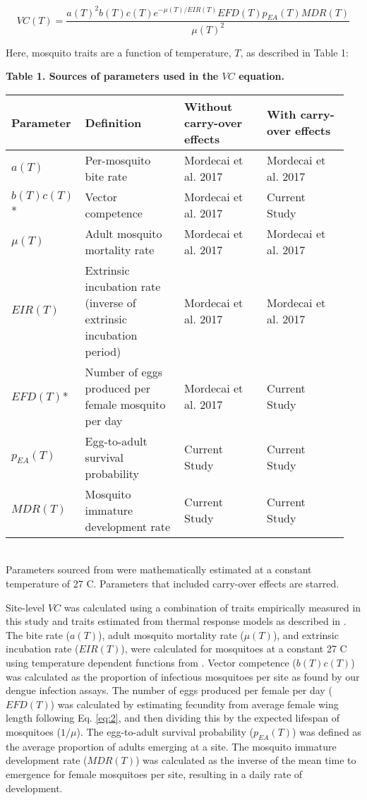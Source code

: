 \documentclass[12pt]{article}
\begin{document}
\begin{equation} \label{eq:3}
VC(T) =\frac{a(T)^2b(T)c(T)e^{-\mu (T)/EIR(T)} EFD(T) p_{EA}(T) MDR(T)} {\mu(T)^2}
\end{equation}

Here, mosquito traits are a function of temperature, $T$, as described in Table 1:

\begin{table}[h]
  \begin{flushleft}
\textbf{Table 1. Sources of parameters used in the $VC$ equation.}
\end{flushleft}
\begin{tabular}{|P{0.15\linewidth}P{0.3\linewidth}P{0.25\linewidth}P{0.25\linewidth}|}
\hline
\textbf{Parameter} & \textbf{Definition} & \textbf{Without carry-over effects} & \textbf{With carry-over effects}\\
\hline
$a(T)$ & Per-mosquito bite rate & Mordecai et al. 2017 & Mordecai et al. 2017 \\
$b(T)c(T)$* & Vector competence & Mordecai et al. 2017 & Current Study \\
$\mu(T)$ & Adult mosquito mortality rate & Mordecai et al. 2017 & Mordecai et al. 2017 \\
$EIR(T)$ & Extrinsic incubation rate (inverse of extrinsic incubation period) & Mordecai et al. 2017 & Mordecai et al. 2017 \\
$EFD(T)$* & Number of eggs produced per female mosquito per day & Mordecai et al. 2017 & Current Study \\
$p_{EA}(T)$ & Egg-to-adult survival probability & Current Study & Current Study \\
$MDR(T)$ & Mosquito immature development rate & Current Study & Current Study \\
\hline
\end{tabular}
\\[1.5pt]

Parameters sourced from \citep{mordecai2017} were mathematically estimated at a constant temperature of 27 \degree C. Parameters that included carry-over effects are starred.
\end{table}

Site-level $VC$ was calculated using a combination of traits empirically measured in this study and traits estimated from thermal response models as described in \citep{mordecai2017}. The bite rate ($a(T)$), adult mosquito mortality rate ($\mu(T)$), and extrinsic incubation rate ($EIR(T)$), were calculated for mosquitoes at a constant 27 \degree C using temperature dependent functions from \citep{mordecai2017}. Vector competence ($b(T)c(T)$) was calculated as the proportion of infectious mosquitoes per site as found by our dengue infection assays. The number of eggs produced per female per day ($EFD(T)$) was calculated by estimating fecundity from average female wing length following Eq. \ref{eq:2}, and then dividing this by the expected lifespan of mosquitoes ($1/\mu$). The egg-to-adult survival probability ($p_{EA}(T)$) was defined as the average proportion of adults emerging at a site. The mosquito immature development rate ($MDR(T)$) was calculated as the inverse of the mean time to emergence for female mosquitoes per site, resulting in a daily rate of development.
\end{document}
